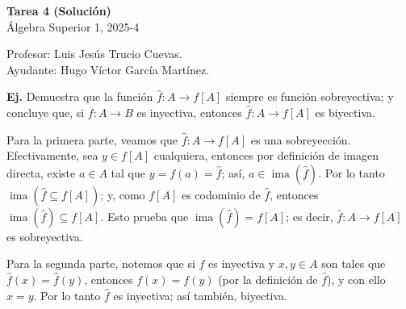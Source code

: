\documentclass[letterpaper,DIV=14,headsepline,12pt]{scrartcl}
\makeatletter
\newcounter{Ejer}
\newcommand{\pts}{}
\newenvironment{ejercicio}[1]{\noindent
    \ifthenelse{\equal{#1}{1} \OR \equal{#1}{+1}}{\renewcommand{\pts}{\textbf{(#1 pt)}}}{\renewcommand{\pts}{\textbf{(#1 pts)}}}\textbf{Ej. \theEjer} \pts\stepcounter{Ejer}}{\vspace{.3cm}}
\DeclareMathOperator{\ima}{ima}
\renewenvironment{proof}[1][]{%
        \par\pushQED{\qed}%
        \normalfont\topsep6pt \partopsep0pt %
        \trivlist
        \item[\hskip\labelsep
                \textbf{\textit{Demostración.}}%
        ]#1
        }{%
        \popQED\endtrivlist\@endpefalse
    }
\makeatother
\begin{document}
    \begin{center}
        {\fontsize{30}{60}\rmfamily \textbf{Tarea 4 (Solución)}} \\ \vspace{.2cm} Álgebra
        Superior 1, 2025-4
    \end{center}
    \begin{flushright}
        \footnotesize \hfill Profesor: Luis Jesús Trucio Cuevas.\\
        \hfill Ayudante: Hugo Víctor García Martínez.
    \end{flushright}

    \begin{ejercicio}{1}\label{ej:sobresuimagen} Demuestra que la función
        $\hat{f}\colon A \to f[A]$ siempre es función sobreyectiva; y concluye que, si
        $f\colon A \to B$ es inyectiva, entonces $\hat{f}\colon A \to f[A]$ es biyectiva.
    \end{ejercicio}
    \begin{proof}
        Para la primera parte, veamos que $\hat{f}\colon A \to f[A]$ es una sobreyección. Efectivamente, sea $y \in f[A]$ cualquiera, entonces por definición de imagen directa, existe $a \in A $ tal que $y=f(a)=\hat{f}$; así, $a \in \ima(\hat{f})$. Por lo tanto $\ima(\hat{f} \subseteq f[A])$; y, como $f[A]$ es codominio de $\hat{f}$, entonces $\ima(\hat{f}) \subseteq f[A]$. Esto prueba que $\ima(\hat{f})=f[A]$; es decir, $\hat{f}\colon A \to f[A]$ es sobreyectiva.

        Para la segunda parte, notemos que si $f$ es inyectiva y $x,y \in A$ son tales que $\hat{f}(x)=\hat{f}(y)$, entonces $f(x)=f(y)$ (por la definición de $\hat{f}$), y con ello $x=y$. Por lo tanto $\hat{f}$ es inyectiva; así también, biyectiva.
    \end{proof}
\end{document}
